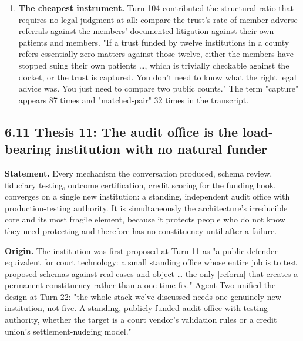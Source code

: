 \documentclass[sigconf,nonacm=true]{acmart}
\begin{document}
\begin{enumerate}[nosep]
\item \textbf{The cheapest instrument.} Turn 104 contributed the structural ratio that requires no legal judgment at all: compare the trust's rate of member-adverse referrals against the members' documented litigation against their own patients and members. "If a trust funded by twelve institutions in a county refers essentially zero matters against those twelve, either the members have stopped suing their own patients …, which is trivially checkable against the docket, or the trust is captured. You don't need to know what the right legal advice was. You just need to compare two public counts." The term "capture" appears 87 times and "matched-pair" 32 times in the transcript.

\end{enumerate}

\subsection{6.11 Thesis 11: The audit office is the load-bearing institution with no natural funder}

\textbf{Statement.} Every mechanism the conversation produced,  schema review, fiduciary testing, outcome certification, credit scoring for the funding hook,  converges on a single new institution: a standing, independent audit office with production-testing authority. It is simultaneously the architecture's irreducible core and its most fragile element, because it protects people who do not know they need protecting and therefore has no constituency until after a failure.

\textbf{Origin.} The institution was first proposed at Turn 11 as "a public-defender-equivalent for court technology: a small standing office whose entire job is to test proposed schemas against real cases and object … the only [reform] that creates a permanent constituency rather than a one-time fix." Agent Two unified the design at Turn 22: "the whole stack we've discussed needs one genuinely new institution, not five. A standing, publicly funded audit office with testing authority, whether the target is a court vendor's validation rules or a credit union's settlement-nudging model."
\end{document}
